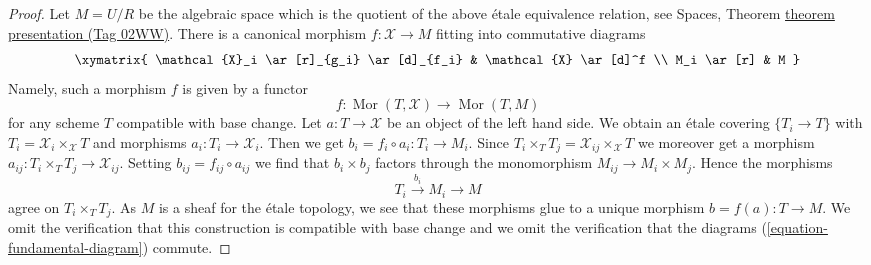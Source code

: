 \documentclass{amsart}
\theoremstyle{plain}
\theoremstyle{definition}
\theoremstyle{remark}
\numberwithin{equation}{subsection}
\def\Mor{\mathop{\mathrm{Mor}}\nolimits}
\begin{document}
\begin{proof}
\medskip\noindent
Let $M = U/R$ be the algebraic space which is the quotient of the above
\'etale equivalence relation, see
Spaces, Theorem \href{https://stacks.math.columbia.edu/tag/02WW}{theorem presentation (Tag 02WW)}.
There is a canonical morphism $f : \mathcal{X} \to M$
fitting into commutative diagrams
\begin{equation}
\label{equation-fundamental-diagram}
\xymatrix{
\mathcal{X}_i \ar[r]_{g_i} \ar[d]_{f_i} & \mathcal{X} \ar[d]^f \\
M_i \ar[r] & M
}
\end{equation}
Namely, such a morphism $f$ is given by a functor
$$
f : \Mor(T, \mathcal{X}) \longrightarrow \Mor(T, M)
$$
for any scheme $T$ compatible with base change. Let $a : T \to \mathcal{X}$
be an object of the left hand side. We obtain an \'etale covering
$\{T_i \to T\}$ with $T_i = \mathcal{X}_i \times_\mathcal{X} T$
and morphisms $a_i : T_i \to \mathcal{X}_i$. Then we get
$b_i = f_i \circ a_i : T_i \to M_i$. Since
$T_i \times_T T_j = \mathcal{X}_{ij} \times_\mathcal{X} T$
we moreover get a morphism $a_{ij} : T_i \times_T T_j \to \mathcal{X}_{ij}$.
Setting $b_{ij} = f_{ij} \circ a_{ij}$ we find that
$b_i \times b_j$ factors through the monomorphism
$M_{ij} \to M_i \times M_j$. Hence the morphisms
$$
T_i \xrightarrow{b_i} M_i \to M
$$
agree on $T_i \times_T T_j$. As $M$ is a sheaf for the \'etale
topology, we see that these morphisms glue to a unique
morphism $b = f(a) : T \to M$. We omit the verification that
this construction is compatible with base change and we omit
the verification that the diagrams
(\ref{equation-fundamental-diagram}) commute.


\end{proof}
\end{document}
